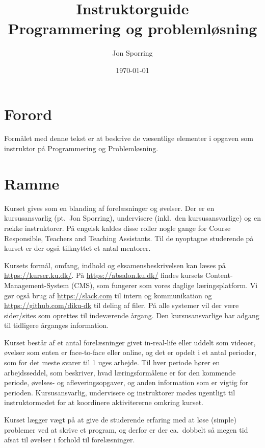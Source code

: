 \documentclass[a4paper]{article}
\title{Instruktorguide\\Programmering og problemløsning}
\author{Jon Sporring}
\date{\today}
\begin{document}
\maketitle

\section{Forord}
Formålet med denne tekst er at beskrive de væsentlige elementer i
opgaven som instruktor på Programmering og Problemløsning.

\section{Ramme}
Kurset gives som en blanding af forelæsninger og øvelser. Der er en
kursusansvarlig (pt.\ Jon Sporring), undervisere (inkl.\ den
kursusansvarlige) og en række instruktorer. På engelsk kaldes disse
roller nogle gange for Course Responsible, Teachers and Teaching
Assistants. Til de nyoptagne studerende på kurset er der også
tilknyttet et antal mentorer.

Kursets formål, omfang, indhold og eksamensbeskrivelsen kan læses på
\url{https://kurser.ku.dk/}. På \url{https://absalon.ku.dk/} findes
kursets Content-Management-System (CMS), som fungerer som vores
daglige læringsplatform. Vi gør også brug af \url{https://slack.com}
til intern og kommunikation og \url{https://github.com/diku-dk} til
deling af filer. På alle systemer vil der være sider/sites som
oprettes til indeværende årgang. Den kursusansvarlige har adgang til
tidligere årganges information.

Kurset består af et antal forelæsninger givet in-real-life eller
uddelt som videoer, øvelser som enten er face-to-face eller online, og
det er opdelt i et antal perioder, som for det meste svarer til 1 uges
arbejde. Til hver periode hører en arbejdsseddel, som beskriver, hvad
læringsformålene er for den kommende periode, øvelses- og
afleveringsopgaver, og anden information som er vigtig for
perioden. Kursusansvarlig, undervisere og instruktorer mødes ugentligt
til instruktormødet for at koordinere aktivitererne omkring kurset.

Kurset lægger vægt på at give de studerende erfaring med at løse
(simple) problemer ved at skrive et program, og derfor er der
ca.\ dobbelt så megen tid afsat til øvelser i forhold til
forelæsninger.
\end{document}
